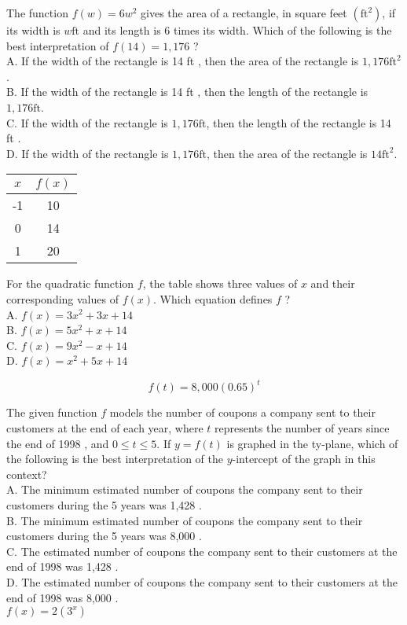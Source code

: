 The function $f(w)=6 w^{2}$ gives the area of a rectangle, in square feet $\left(\mathrm{ft}^{2}\right)$, if its width is $w \mathrm{ft}$ and its length is 6 times its width. Which of the following is the best interpretation of $f(14)=1,176$ ?\\
A. If the width of the rectangle is 14 ft , then the area of the rectangle is $1,176 \mathrm{ft}^{2}$.\\
B. If the width of the rectangle is 14 ft , then the length of the rectangle is $1,176 \mathrm{ft}$.\\
C. If the width of the rectangle is $1,176 \mathrm{ft}$, then the length of the rectangle is 14 ft .\\
D. If the width of the rectangle is $1,176 \mathrm{ft}$, then the area of the rectangle is $14 \mathrm{ft}^{2}$.

\begin{center}
\begin{tabular}{|c|c|}
\hline
$x$ & $f(x)$ \\
\hline
-1 & 10 \\
\hline
0 & 14 \\
\hline
1 & 20 \\
\hline
\end{tabular}
\end{center}

For the quadratic function $f$, the table shows three values of $x$ and their corresponding values of $f(x)$. Which equation defines $f$ ?\\
A. $f(x)=3 x^{2}+3 x+14$\\
B. $f(x)=5 x^{2}+x+14$\\
C. $f(x)=9 x^{2}-x+14$\\
D. $f(x)=x^{2}+5 x+14$

$$
f(t)=8,000(0.65)^{t}
$$

The given function $f$ models the number of coupons a company sent to their customers at the end of each year, where $t$ represents the number of years since the end of 1998 , and $0 \leq t \leq 5$. If $y=f(t)$ is graphed in the ty-plane, which of the following is the best interpretation of the $y$-intercept of the graph in this context?\\
A. The minimum estimated number of coupons the company sent to their customers during the 5 years was 1,428 .\\
B. The minimum estimated number of coupons the company sent to their customers during the 5 years was 8,000 .\\
C. The estimated number of coupons the company sent to their customers at the end of 1998 was 1,428 .\\
D. The estimated number of coupons the company sent to their customers at the end of 1998 was 8,000 .\\
$f(x)=2\left(3^{x}\right)$


